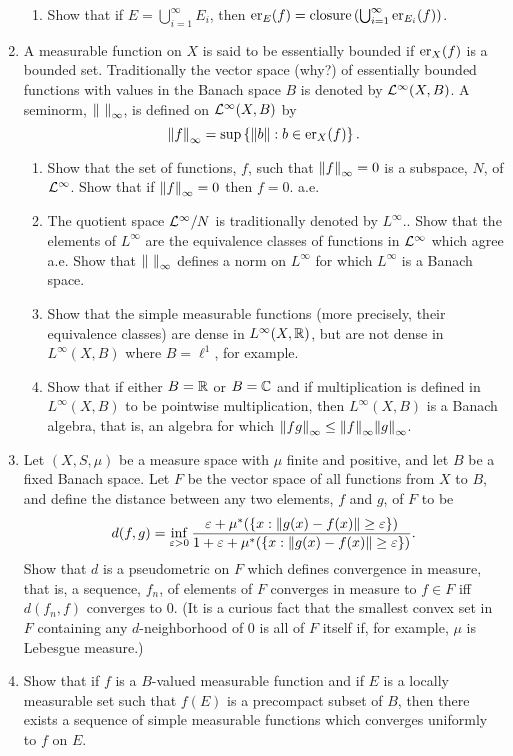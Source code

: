 \begin{enumerate}[label=\arabic*).]
\begin{enumerate}
    \item Show that if $E=\bigcup_{i=1}^\infty E_i$, then $\er{f}{E}=\text{closure}\br{\bigcup_{i=1}^\infty\er{f}{E_i}}$.
\end{enumerate}

\item A measurable function on $X$ is said to be essentially bounded if $\er{f}{X}$ is a bounded set. Traditionally the vector space (why?) of essentially bounded functions with values in the Banach space $B$ is denoted by $\cL^\infty(X, B)$. A seminorm, $\norm{~}_\infty$, is defined on $\cL^\infty(X, B)$ by $$\norm{f}_\infty=\sup\brc{\norm{b}: b\in\er{f}{X}}.$$
\begin{enumerate}
    \item Show that the set of functions, $f$, such that $\norm{f}_\infty=0$ is a subspace, $N$, of $\cL^\infty$. Show that if $\norm{f}_\infty=0$ then $f=0$. a.e.
    
    \item The quotient space $\cL^\infty/N$ is traditionally denoted by $L^\infty .$. Show that the elements of $L^\infty$ are the equivalence classes of functions in $\cL^\infty$ which agree a.e. Show that $\norm{~}_\infty$ defines a norm on $L^\infty$ for which $L^\infty$ is a Banach space.

    \item Show that the simple measurable functions (more precisely, their equivalence classes) are dense in $L^\infty(X,\bR)$, but are not dense in $L^\infty(X, B)$ where $B=\ell^1$, for example.

    \item Show that if either $B=\bR$ or $B=\bC$ and if multiplication is defined in $L^\infty(X, B)$ to be pointwise multiplication, then $L^\infty(X, B)$ is a Banach algebra, that is, an algebra for which $\norm{fg}_\infty\leq\norm{f}_\infty\norm{g}_\infty$.
\end{enumerate}

\item Let $(X, S, \mu)$ be a measure space with $\mu$ finite and positive, and let $B$ be a fixed Banach space. Let $F$ be the vector space of all functions from $X$ to $B$, and define the distance between any two elements, $f$ and $g$, of $F$ to be $$d(f,g)=\inf_{\ep>0}\frac{\ep+\mu^*(\brc{x:\norm{g(x)-f(x)}\geq\ep})}{1+\ep+\mu^*(\brc{x:\norm{g(x)-f(x)}\geq\ep})}.$$
Show that $d$ is a pseudometric on $F$ which defines convergence in measure, that is, a sequence, $f_n$, of elements of $F$ converges in measure to $f \in F$ iff $d(f_n, f)$ converges to 0. (It is a curious fact that the smallest convex set in $F$ containing any $d$-neighborhood of 0 is all of $F$ itself if, for example, $\mu$ is Lebesgue measure.)

\item Show that if $f$ is a $B$-valued measurable function and if $E$ is a locally measurable set such that $f(E)$ is a precompact subset of $B$, then there exists a sequence of simple measurable functions which converges uniformly to $f$ on $E$.
\end{enumerate}